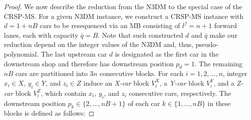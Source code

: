 \documentclass[12pt]{article}
\begin{document}
\begin{proof}



    We now describe the reduction from the N3DM to the special case of the CRSP-MS. For a given N3DM instance, we construct a CRSP-MS instance with $d=1+nB$ cars to be resequenced via an MB consisting of $l^f=n+1$ forward lanes, each with capacity $\bar{q}=B$. Note that such constructed $d$ and $\bar{q}$ make our reduction depend on the integer values of the N3DM and, thus, pseudo-polynomial. The last upstream car $d$ is designated as the first car in the downstream shop and therefore has downstream position $p_d=1$. The remaining $nB$ cars are partitioned into $3n$ consecutive blocks. For each $i = 1,2,\dots,n$, integer $x_i\in X$, $y_i\in Y$, and $z_i\in Z$ induce an \textit{X-car} block $V^X_i$, a \textit{Y-car} block $V^Y_i$, and a \textit{Z-car} block $V^Z_i$, which contain $x_i$, $y_i$, and $z_i$ consecutive cars, respectively. The downstream position $p_k\in \{2,\dots,nB+1\}$ of each car $k\in \{1,\dots,nB\}$ in these blocks is defined as follows:



\end{proof}
\end{document}
